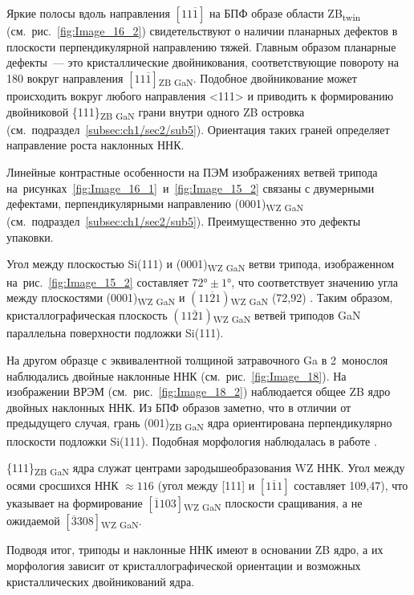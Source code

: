 Яркие полосы вдоль направления \([11\overline{1}]\) на БПФ образе области
ZB\textsubscript{twin} (см.~рис.~\cref{fig:Image_16_2}) свидетельствуют о
наличии планарных дефектов в плоскости перпендикулярной направлению тяжей.
Главным образом планарные дефекты~--- это кристаллические двойникования,
соответствующие повороту на 180{\textdegree} вокруг направления
\([11\overline{1}]\)\textsubscript{ZB GaN}. Подобное двойникование может
происходить вокруг любого направления <111> \cite{Suturin2017} и приводить к
формированию двойниковой \{111\}\textsubscript{ZB GaN} грани внутри одного ZB
островка (см.~подраздел~\cref{subsec:ch1/sec2/sub5}). Ориентация таких граней
определяет направление роста наклонных ННК.

Линейные контрастные особенности на ПЭМ изображениях ветвей трипода
на~рисунках~\cref{fig:Image_16_1}~и~\cref{fig:Image_15_2} связаны с двумерными
дефектами, перпендикулярными направлению (0001)\textsubscript{WZ GaN}
(см.~подраздел~\cref{subsec:ch1/sec2/sub5}). Преимущественно это дефекты
упаковки.

Угол между плоскостью Si(111) и (0001)\textsubscript{WZ GaN} ветви трипода,
изображенном на~рис.~\cref{fig:Image_15_2} составляет \(72\si{\degree} \pm
1\si{\degree}\), что соответствует значению угла между плоскостями
(0001)\textsubscript{WZ GaN} и \((11\overline{2}1)\)\textsubscript{WZ GaN}
(72,92\textdegree) \cite{Wang2016}. Таким образом, кристаллографическая
плоскость \((11\overline{2}1)\)\textsubscript{WZ GaN} ветвей триподов GaN
параллельна поверхности подложки Si(111).

На другом образце с эквивалентной толщиной затравочного Ga в 2~монослоя
наблюдались двойные наклонные ННК (см.~рис.~\cref{fig:Image_18}). На
изображении ВРЭМ (см.~рис.~\cref{fig:Image_18_2}) наблюдается общее ZB ядро
двойных наклонных ННК. Из БПФ образов заметно, что в отличии от предыдущего
случая, грань (001)\textsubscript{ZB GaN} ядра ориентирована перпендикулярно
плоскости подложки Si(111). Подобная морфология наблюдалась в работе
\cite{Wang2017}.

\{111\}\textsubscript{ZB GaN} ядра служат центрами зародышеобразования WZ ННК.
Угол между осями сросшихся ННК \(\approx 116\){\textdegree} (угол между [111] и
\([\overline{111}]\) составляет 109,47\textdegree), что указывает на
формирование \([\overline{1}103]\)\textsubscript{WZ GaN} плоскости сращивания,
а не ожидаемой \([\overline{3}308]\)\textsubscript{WZ GaN}.

Подводя итог, триподы и наклонные ННК имеют в основании ZB ядро, а их
морфология зависит от кристаллографической ориентации и возможных
кристаллических двойникований ядра.

